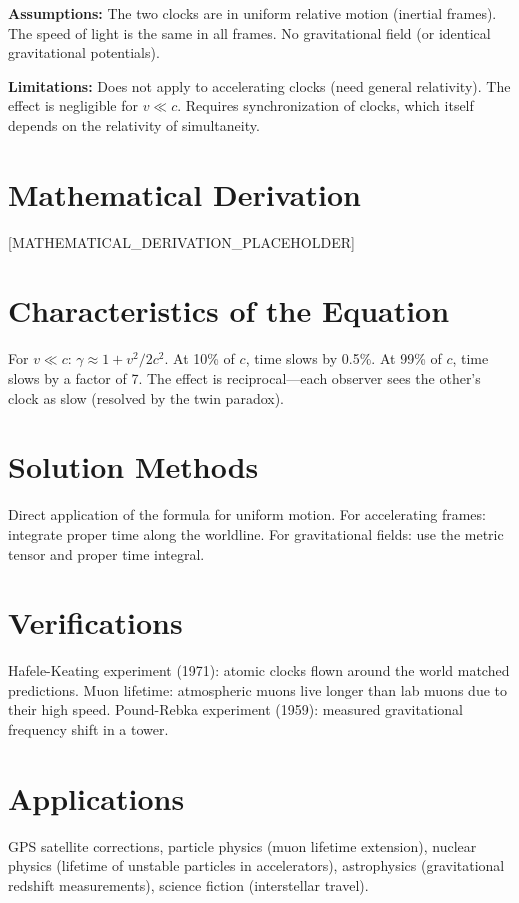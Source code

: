\documentclass[11pt,openright]{book}
\begin{document}
\textbf{Assumptions:} The two clocks are in uniform relative motion (inertial frames). The speed of light is the same in all frames. No gravitational field (or identical gravitational potentials).


\textbf{Limitations:} Does not apply to accelerating clocks (need general relativity). The effect is negligible for $v \ll c$. Requires synchronization of clocks, which itself depends on the relativity of simultaneity.


\section*{Mathematical Derivation}

[MATHEMATICAL_DERIVATION_PLACEHOLDER]

\section*{Characteristics of the Equation}

For $v \ll c$: $\gamma \approx 1 + v^2/2c^2$. At 10\% of $c$, time slows by 0.5\%. At 99\% of $c$, time slows by a factor of 7. The effect is reciprocal---each observer sees the other's clock as slow (resolved by the twin paradox).
\section*{Solution Methods}

Direct application of the formula for uniform motion. For accelerating frames: integrate proper time along the worldline. For gravitational fields: use the metric tensor and proper time integral.
\section*{Verifications}

Hafele-Keating experiment (1971): atomic clocks flown around the world matched predictions. Muon lifetime: atmospheric muons live longer than lab muons due to their high speed. Pound-Rebka experiment (1959): measured gravitational frequency shift in a tower.
\section*{Applications}

GPS satellite corrections, particle physics (muon lifetime extension), nuclear physics (lifetime of unstable particles in accelerators), astrophysics (gravitational redshift measurements), science fiction (interstellar travel).
\end{document}
